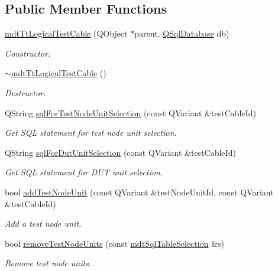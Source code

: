 \subsection*{Public Member Functions}
\begin{DoxyCompactItemize}
\item 
\hyperlink{classmdt_tt_logical_test_cable_a65273c35294da55d60c6058d8152dd99}{mdt\-Tt\-Logical\-Test\-Cable} (Q\-Object $\ast$parent, \hyperlink{class_q_sql_database}{Q\-Sql\-Database} db)
\begin{DoxyCompactList}\small\item\em Constructor. \end{DoxyCompactList}\item 
\hyperlink{classmdt_tt_logical_test_cable_ab616c2d7e2d637c333bb4fdca0c04433}{$\sim$mdt\-Tt\-Logical\-Test\-Cable} ()
\begin{DoxyCompactList}\small\item\em Destructor. \end{DoxyCompactList}\item 
Q\-String \hyperlink{classmdt_tt_logical_test_cable_af28d1e414a57f7a5629cbadfd580f4ed}{sql\-For\-Test\-Node\-Unit\-Selection} (const Q\-Variant \&test\-Cable\-Id)
\begin{DoxyCompactList}\small\item\em Get S\-Q\-L statement for test node unit selection. \end{DoxyCompactList}\item 
Q\-String \hyperlink{classmdt_tt_logical_test_cable_a7673a73bc58e43362658398d89cfa6d0}{sql\-For\-Dut\-Unit\-Selection} (const Q\-Variant \&test\-Cable\-Id)
\begin{DoxyCompactList}\small\item\em Get S\-Q\-L statement for D\-U\-T unit selection. \end{DoxyCompactList}\item 
bool \hyperlink{classmdt_tt_logical_test_cable_ad0864808c772c8e5331745d389a7188b}{add\-Test\-Node\-Unit} (const Q\-Variant \&test\-Node\-Unit\-Id, const Q\-Variant \&test\-Cable\-Id)
\begin{DoxyCompactList}\small\item\em Add a test node unit. \end{DoxyCompactList}\item 
bool \hyperlink{classmdt_tt_logical_test_cable_aac46139aa117e61b265e63401125d181}{remove\-Test\-Node\-Units} (const \hyperlink{classmdt_sql_table_selection}{mdt\-Sql\-Table\-Selection} \&s)
\begin{DoxyCompactList}\small\item\em Remove test node units. \end{DoxyCompactList}\item 

\end{DoxyCompactItemize}

